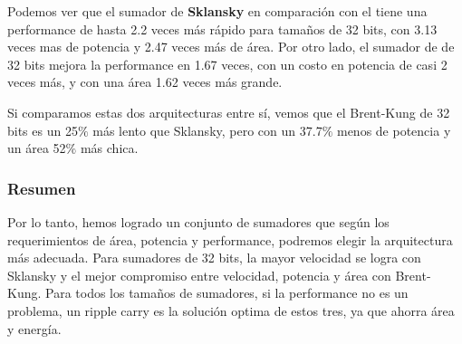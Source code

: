 Podemos ver que el sumador de \textbf{Sklansky} en comparación con el  tiene una performance de hasta 2.2 veces más rápido para tamaños de 32 bits, con 3.13 veces mas de potencia y 2.47 veces más de área. Por otro lado, el sumador de  de 32 bits mejora la performance en 1.67 veces, con un costo en potencia de casi 2 veces más, y con una área 1.62 veces más grande. 

Si comparamos estas dos arquitecturas entre sí, vemos que el Brent-Kung de 32 bits es un 25$\%$ más lento que Sklansky, pero con un 37.7$\%$ menos de potencia y un área 52$\%$ más chica.


\subsubsection{Resumen}
Por lo tanto, hemos logrado un conjunto de sumadores que según los requerimientos de área, potencia y performance, podremos elegir la arquitectura más adecuada. Para sumadores de 32 bits, la mayor velocidad se logra con Sklansky y el mejor compromiso entre velocidad, potencia y área con Brent-Kung. Para todos los tamaños de sumadores, si la performance no es un problema, un ripple carry es la solución optima de estos tres, ya que ahorra área y energía.





